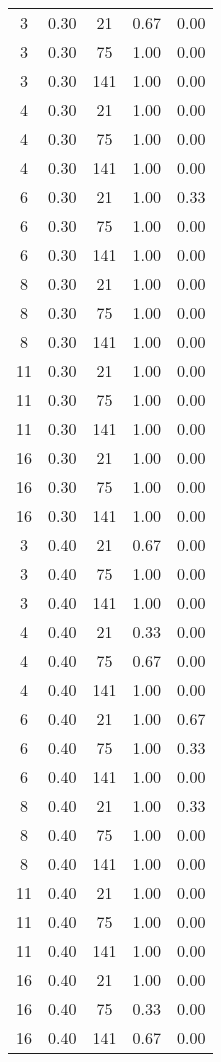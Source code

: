 \documentclass[10pt,a4paper]{article}
\begin{document}
\begin{center}
\begin{longtable}{ccccc}
3  & 0.30 & 21  & 0.67 & 0.00 \\
3  & 0.30 & 75  & 1.00 & 0.00 \\
3  & 0.30 & 141 & 1.00 & 0.00 \\
4  & 0.30 & 21  & 1.00 & 0.00 \\
4  & 0.30 & 75  & 1.00 & 0.00 \\
4  & 0.30 & 141 & 1.00 & 0.00 \\
6  & 0.30 & 21  & 1.00 & 0.33 \\
6  & 0.30 & 75  & 1.00 & 0.00 \\
6  & 0.30 & 141 & 1.00 & 0.00 \\
8  & 0.30 & 21  & 1.00 & 0.00 \\
8  & 0.30 & 75  & 1.00 & 0.00 \\
8  & 0.30 & 141 & 1.00 & 0.00 \\
11 & 0.30 & 21  & 1.00 & 0.00 \\
11 & 0.30 & 75  & 1.00 & 0.00 \\
11 & 0.30 & 141 & 1.00 & 0.00 \\
16 & 0.30 & 21  & 1.00 & 0.00 \\
16 & 0.30 & 75  & 1.00 & 0.00 \\
16 & 0.30 & 141 & 1.00 & 0.00 \\
3  & 0.40 & 21  & 0.67 & 0.00 \\
3  & 0.40 & 75  & 1.00 & 0.00 \\
3  & 0.40 & 141 & 1.00 & 0.00 \\
4  & 0.40 & 21  & 0.33 & 0.00 \\
4  & 0.40 & 75  & 0.67 & 0.00 \\
4  & 0.40 & 141 & 1.00 & 0.00 \\
6  & 0.40 & 21  & 1.00 & 0.67 \\
6  & 0.40 & 75  & 1.00 & 0.33 \\
6  & 0.40 & 141 & 1.00 & 0.00 \\
8  & 0.40 & 21  & 1.00 & 0.33 \\
8  & 0.40 & 75  & 1.00 & 0.00 \\
8  & 0.40 & 141 & 1.00 & 0.00 \\
11 & 0.40 & 21  & 1.00 & 0.00 \\
11 & 0.40 & 75  & 1.00 & 0.00 \\
11 & 0.40 & 141 & 1.00 & 0.00 \\
16 & 0.40 & 21  & 1.00 & 0.00 \\
16 & 0.40 & 75  & 0.33 & 0.00 \\
16 & 0.40 & 141 & 0.67 & 0.00 \\
\end{longtable}
\end{center}
\end{document}
